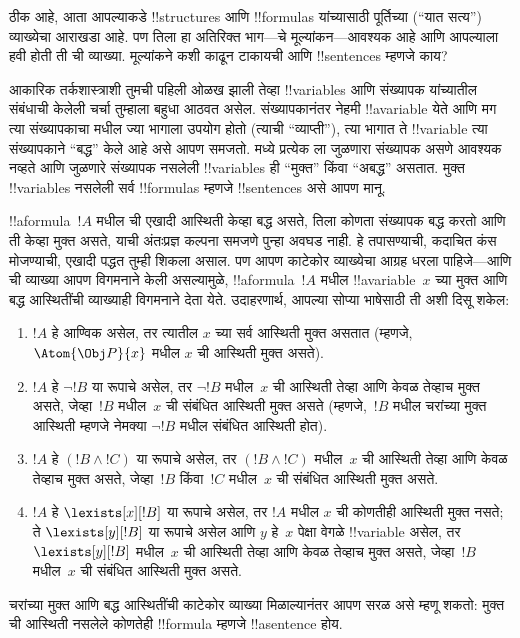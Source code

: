 \documentclass[../../../include/open-logic-section]{subfiles}
\begin{document}


ठीक आहे, आता आपल्याकडे !!{structure}s आणि !!{formula}s यांच्यासाठी
पूर्तिच्या (``यात सत्य'') व्याख्येचा आराखडा आहे. पण तिला हा अतिरिक्त
भाग---चे मूल्यांकन---आवश्यक आहे आणि आपल्याला हवी होती ती
ची व्याख्या. मूल्यांकने कशी काढून टाकायची आणि
!!{sentence}s म्हणजे काय?

आकारिक तर्कशास्त्राशी तुमची पहिली ओळख झाली तेव्हा !!{variable}s आणि
संख्यापक यांच्यातील संबंधाची केलेली चर्चा तुम्हाला बहुधा आठवत असेल.
संख्यापकानंतर नेहमी !!a{variable} येते आणि मग त्या संख्यापकाचा
मधील ज्या भागाला उपयोग होतो (त्याची ``व्याप्ती''), त्या
भागात ते !!{variable} त्या संख्यापकाने ``बद्ध'' केले आहे असे आपण
समजतो. मध्ये प्रत्येक ला जुळणारा संख्यापक
असणे आवश्यक नव्हते आणि जुळणारे संख्यापक नसलेली !!{variable}s ही
``मुक्त'' किंवा ``अबद्ध'' असतात. मुक्त !!{variable}s नसलेली सर्व
!!{formula}s म्हणजे !!{sentence}s असे आपण मानू.

!!a{formula}~$!A$ मधील ची एखादी आस्थिती केव्हा बद्ध असते,
तिला कोणता संख्यापक बद्ध करतो आणि ती केव्हा मुक्त असते, याची अंतःप्रज्ञ
कल्पना समजणे पुन्हा अवघड नाही. हे तपासण्याची, कदाचित कंस मोजण्याची,
एखादी पद्धत तुम्ही शिकला असाल. पण आपण काटेकोर व्याख्येचा आग्रह धरला
पाहिजे---आणि ची व्याख्या आपण विगमनाने केली असल्यामुळे,
!!a{formula}~$!A$ मधील !!a{variable}~$x$ च्या मुक्त आणि बद्ध आस्थितींची
व्याख्याही विगमनाने देता येते. उदाहरणार्थ, आपल्या सोप्या भाषेसाठी ती
अशी दिसू शकेल:
\begin{enumerate}
  \item $!A$ हे आण्विक असेल, तर त्यातील $x$ च्या सर्व आस्थिती मुक्त
  असतात (म्हणजे, $\Atom{\Obj P}{x}$ मधील $x$ ची आस्थिती मुक्त असते).
  \item $!A$ हे $\lnot !B$ या रूपाचे असेल, तर $\lnot !B$ मधील~$x$ ची
  आस्थिती तेव्हा आणि केवळ तेव्हाच मुक्त असते, जेव्हा~$!B$ मधील~$x$ ची
  संबंधित आस्थिती मुक्त असते (म्हणजे,~$!B$ मधील चरांच्या मुक्त
  आस्थिती म्हणजे नेमक्या $\lnot !B$ मधील संबंधित आस्थिती होत).
  \item $!A$ हे $(!B \land !C)$ या रूपाचे असेल, तर $(!B \land !C)$
  मधील~$x$ ची आस्थिती तेव्हा आणि केवळ तेव्हाच मुक्त असते, जेव्हा~$!B$
  किंवा~$!C$ मधील~$x$ ची संबंधित आस्थिती मुक्त असते.
  \item $!A$ हे $\lexists[x][!B]$ या रूपाचे असेल, तर $!A$ मधील $x$ ची
  कोणतीही आस्थिती मुक्त नसते; ते $\lexists[y][!B]$ या रूपाचे असेल आणि
  $y$ हे~$x$ पेक्षा वेगळे !!{variable} असेल, तर
  $\lexists[y][!B]$ मधील~$x$ ची आस्थिती तेव्हा आणि केवळ तेव्हाच मुक्त
  असते, जेव्हा~$!B$ मधील~$x$ ची संबंधित आस्थिती मुक्त असते.
\end{enumerate}

चरांच्या मुक्त आणि बद्ध आस्थितींची काटेकोर व्याख्या मिळाल्यानंतर आपण
सरळ असे म्हणू शकतो: मुक्त ची आस्थिती नसलेले कोणतेही
!!{formula} म्हणजे !!a{sentence} होय.
\end{document}
